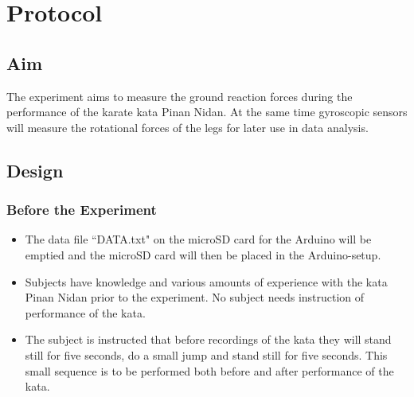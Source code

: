 \section{Protocol}
\subsection{Aim}
The experiment aims to measure the ground reaction forces during the performance of the karate kata Pinan Nidan. At the same time gyroscopic sensors will measure the rotational forces of the legs for later use in data analysis.

\subsection{Design}
\subsubsection{Before the Experiment}
\begin{itemize}
\item The data file “DATA.txt" on the microSD card for the Arduino will be emptied and the microSD card will then be placed in the Arduino-setup. 
\item Subjects have knowledge and various amounts of experience with the kata Pinan Nidan prior to the experiment. No subject needs instruction of performance of the kata.
\item The subject is instructed that before recordings of the kata they will stand still for five seconds, do a small jump and stand still for five seconds. This small sequence is to be performed both before and after performance of the kata.
\end{itemize}

